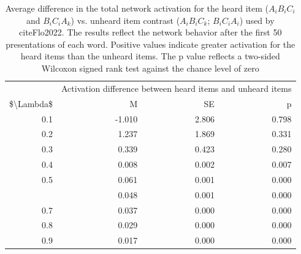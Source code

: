 \documentclass[
]{article}
\begin{document}
\begin{table}

\caption{\label{tab:basic-experiment-global-print-difference-between-3syll-items-from-flo2022}Average difference in the total network activation for the heard item ($A_iB_iC_i$ and $B_iC_iA_k$) vs. unheard item contrast ($A_iB_iC_k$; $B_iC_iA_i$) used by cite{Flo2022}. The results reflect the network behavior after the first 50 presentations of each word. Positive values indicate greater activation for the heard items than the unheard items. The p value reflects a two-sided Wilcoxon signed rank test against the chance level of zero}
\centering
\begin{tabular}[t]{rrrr}
\toprule
\multicolumn{1}{c}{ } & \multicolumn{3}{c}{Activation difference between heard items and unheard items} \\
\cmidrule(l{3pt}r{3pt}){2-4}
\$\textbackslash{}Lambda\$ & M & SE & p\\
\midrule
0.1 & -1.010 & 2.806 & 0.798\\
0.2 & 1.237 & 1.869 & 0.331\\
0.3 & 0.339 & 0.423 & 0.280\\
0.4 & 0.008 & 0.002 & 0.007\\
0.5 & 0.061 & 0.001 & 0.000\\
\addlinespace
0.6 & 0.048 & 0.001 & 0.000\\
0.7 & 0.037 & 0.000 & 0.000\\
0.8 & 0.029 & 0.000 & 0.000\\
0.9 & 0.017 & 0.000 & 0.000\\
\bottomrule
\end{tabular}
\end{table}

  
\end{document}
